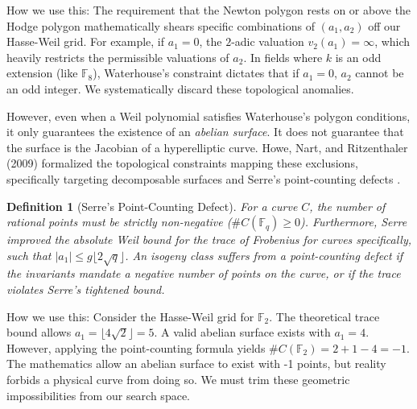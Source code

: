 \documentclass[letterpaper, 11pt]{article}
\newtheorem{definition}[theorem]{Definition}
\begin{document}
How we use this: The requirement that the Newton polygon rests on or above the Hodge polygon mathematically shears specific combinations of $(a_1, a_2)$ off our Hasse-Weil grid. For example, if $a_1 = 0$, the $2$-adic valuation $v_2(a_1) = \infty$, which heavily restricts the permissible valuations of $a_2$. In fields where $k$ is an odd extension (like $\mathbb{F}_8$), Waterhouse's constraint dictates that if $a_1 = 0$, $a_2$ cannot be an odd integer. We systematically discard these topological anomalies.

However, even when a Weil polynomial satisfies Waterhouse's polygon conditions, it only guarantees the existence of an \textit{abelian surface}. It does not guarantee that the surface is the Jacobian of a hyperelliptic curve. Howe, Nart, and Ritzenthaler (2009) formalized the topological constraints mapping these exclusions, specifically targeting decomposable surfaces and Serre's point-counting defects \cite{Howe2009}. 

\begin{definition}[Serre's Point-Counting Defect]
For a curve $C$, the number of rational points must be strictly non-negative ($\#C(\mathbb{F}_q) \ge 0$). Furthermore, Serre improved the absolute Weil bound for the trace of Frobenius for curves specifically, such that $|a_1| \le g \lfloor 2\sqrt{q} \rfloor$. An isogeny class suffers from a point-counting defect if the invariants mandate a negative number of points on the curve, or if the trace violates Serre's tightened bound.
\end{definition}

How we use this: Consider the Hasse-Weil grid for $\mathbb{F}_2$. The theoretical trace bound allows $a_1 = \lfloor 4\sqrt{2} \rfloor = 5$. A valid abelian surface exists with $a_1 = 4$. However, applying the point-counting formula yields $\#C(\mathbb{F}_2) = 2 + 1 - 4 = -1$. The mathematics allow an abelian surface to exist with -1 points, but reality forbids a physical curve from doing so. We must trim these geometric impossibilities from our search space.
\end{document}
